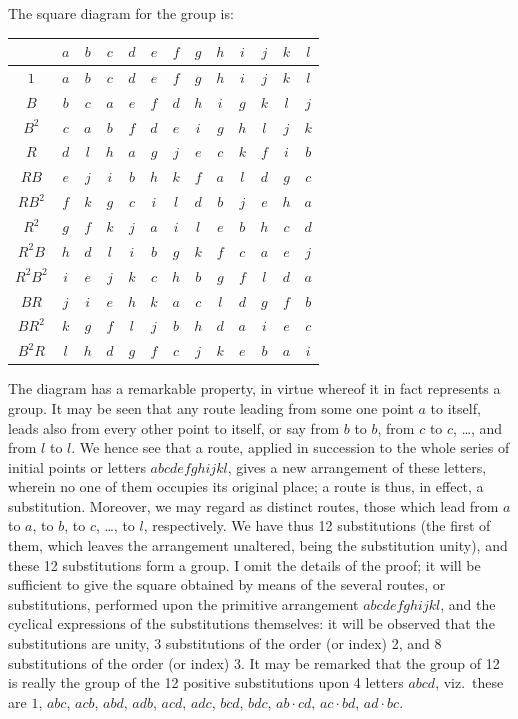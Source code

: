 \documentclass[11pt,a4paper]{article}
\begin{document}
The square diagram for the group is:
\begin{center}
\begin{tabular}{c|cccccccccccc}
& $a$ & $b$ & $c$ & $d$ & $e$ & $f$ & $g$ & $h$ & $i$ & $j$ & $k$ & $l$ \\
\hline
$1$ & $a$ & $b$ & $c$ & $d$ & $e$ & $f$ & $g$ & $h$ & $i$ & $j$ & $k$ & $l$ \\
$B$ & $b$ & $c$ & $a$ & $e$ & $f$ & $d$ & $h$ & $i$ & $g$ & $k$ & $l$ & $j$ \\
$B^2$ & $c$ & $a$ & $b$ & $f$ & $d$ & $e$ & $i$ & $g$ & $h$ & $l$ & $j$ & $k$ \\
$R$ & $d$ & $l$ & $h$ & $a$ & $g$ & $j$ & $e$ & $c$ & $k$ & $f$ & $i$ & $b$ \\
$RB$ & $e$ & $j$ & $i$ & $b$ & $h$ & $k$ & $f$ & $a$ & $l$ & $d$ & $g$ & $c$ \\
$RB^2$ & $f$ & $k$ & $g$ & $c$ & $i$ & $l$ & $d$ & $b$ & $j$ & $e$ & $h$ & $a$ \\
$R^2$ & $g$ & $f$ & $k$ & $j$ & $a$ & $i$ & $l$ & $e$ & $b$ & $h$ & $c$ & $d$ \\
$R^2B$ & $h$ & $d$ & $l$ & $i$ & $b$ & $g$ & $k$ & $f$ & $c$ & $a$ & $e$ & $j$ \\
$R^2B^2$ & $i$ & $e$ & $j$ & $k$ & $c$ & $h$ & $b$ & $g$ & $f$ & $l$ & $d$ & $a$ \\
$BR$ & $j$ & $i$ & $e$ & $h$ & $k$ & $a$ & $c$ & $l$ & $d$ & $g$ & $f$ & $b$ \\
$BR^2$ & $k$ & $g$ & $f$ & $l$ & $j$ & $b$ & $h$ & $d$ & $a$ & $i$ & $e$ & $c$ \\
$B^2R$ & $l$ & $h$ & $d$ & $g$ & $f$ & $c$ & $j$ & $k$ & $e$ & $b$ & $a$ & $i$
\end{tabular}
\end{center}

\clearpage
The diagram has a remarkable property, in virtue whereof it in fact represents a group. It may be seen that any route leading from some one point $a$ to itself, leads also from every other point to itself, or say from $b$ to $b$, from $c$ to $c$, \dots, and from $l$ to $l$. We hence see that a route, applied in succession to the whole series of initial points or letters $abcdefghijkl$, gives a new arrangement of these letters, wherein no one of them occupies its original place; a route is thus, in effect, a substitution. Moreover, we may regard as distinct routes, those which lead from $a$ to $a$, to $b$, to $c$, \dots, to $l$, respectively. We have thus 12 substitutions (the first of them, which leaves the arrangement unaltered, being the substitution unity), and these 12 substitutions form a group. I omit the details of the proof; it will be sufficient to give the square obtained by means of the several routes, or substitutions, performed upon the primitive arrangement $abcdefghijkl$, and the cyclical expressions of the substitutions themselves: it will be observed that the substitutions are unity, 3 substitutions of the order (or index) 2, and 8 substitutions of the order (or index) 3. It may be remarked that the group of 12 is really the group of the 12 positive substitutions upon 4 letters $abcd$, viz.\ these are $1$, $abc$, $acb$, $abd$, $adb$, $acd$, $adc$, $bcd$, $bdc$, $ab \cdot cd$, $ac \cdot bd$, $ad \cdot bc$.
\end{document}
